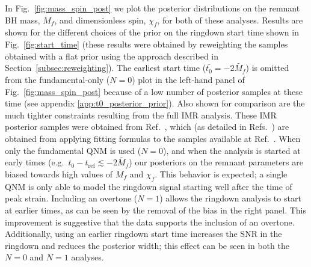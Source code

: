 In Fig.~\ref{fig:mass_spin_post} we plot the posterior distributions on the remnant BH mass, $M_f$, and dimensionless spin, $\chi_f$, for both of these analyses.
Results are shown for the different choices of the prior on the ringdown start time shown in Fig.~\ref{fig:start_time} (these results were obtained by reweighting the samples obtained with a flat prior using the approach described in Section~\ref{subsec:reweighting}).
The earliest start time ($\bar{t_0}=-2\tilde{M_f}$) is omitted from the fundamental-only ($N=0$) plot in the left-hand panel of Fig.~\ref{fig:mass_spin_post} because of a low number of posterior samples at these time (see appendix \ref{app:t0_posterior_prior}).
Also shown for comparison are the much tighter constraints resulting from the full IMR analysis.
These IMR posterior samples were obtained from Ref.~\cite{maximiliano_isi_2022_5965773}, which (as detailed in Refs.~\cite{Isi:2019aib,Isi:2022mhy}) are obtained from applying fitting formulas to the samples available at Ref.~\cite{gwtc1datarelease}. 
When only the fundamental QNM is used ($N=0$), and when the analysis is started at early times (e.g.\ $t_0 - t_\mathrm{ref}\lesssim -2\tilde{M_f}$) our posteriors on the remnant parameters are biased towards high values of $M_f$ and $\chi_f$.
This behavior is expected; a single QNM is only able to model the ringdown signal starting well after the time of peak strain.
Including an overtone ($N=1$) allows the ringdown analysis to start at earlier times, as can be seen by the removal of the bias in the right panel. 
This improvement is suggestive that the data supports the inclusion of an overtone.
Additionally, using an earlier ringdown start time increases the SNR in the ringdown and reduces the posterior width; this effect can be seen in both the $N=0$ and $N=1$ analyses.

